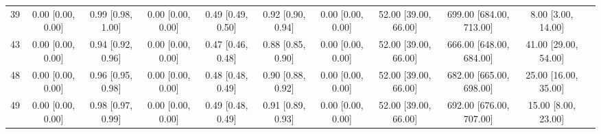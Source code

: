 \documentclass[8pt]{article}
\begin{document}
\begin{center}
\begin{footnotesize}
\begin{longtable}{|ccccccccccc|}
 39 &  0.00 [0.00, 0.00] &  0.99 [0.98, 1.00] &  0.00 [0.00, 0.00] &  0.49 [0.49, 0.50] &  0.92 [0.90, 0.94] &     0.00 [0.00, 0.00] &  52.00 [39.00, 66.00] &  699.00 [684.00, 713.00] &       8.00 [3.00, 14.00] \\
 43 &  0.00 [0.00, 0.00] &  0.94 [0.92, 0.96] &  0.00 [0.00, 0.00] &  0.47 [0.46, 0.48] &  0.88 [0.85, 0.90] &     0.00 [0.00, 0.00] &  52.00 [39.00, 66.00] &  666.00 [648.00, 684.00] &     41.00 [29.00, 54.00] \\
 48 &  0.00 [0.00, 0.00] &  0.96 [0.95, 0.98] &  0.00 [0.00, 0.00] &  0.48 [0.48, 0.49] &  0.90 [0.88, 0.92] &     0.00 [0.00, 0.00] &  52.00 [39.00, 66.00] &  682.00 [665.00, 698.00] &     25.00 [16.00, 35.00] \\
 49 &  0.00 [0.00, 0.00] &  0.98 [0.97, 0.99] &  0.00 [0.00, 0.00] &  0.49 [0.48, 0.49] &  0.91 [0.89, 0.93] &     0.00 [0.00, 0.00] &  52.00 [39.00, 66.00] &  692.00 [676.00, 707.00] &      15.00 [8.00, 23.00] \\
\end{longtable}
\end{footnotesize}
\end{center}
\end{document}
